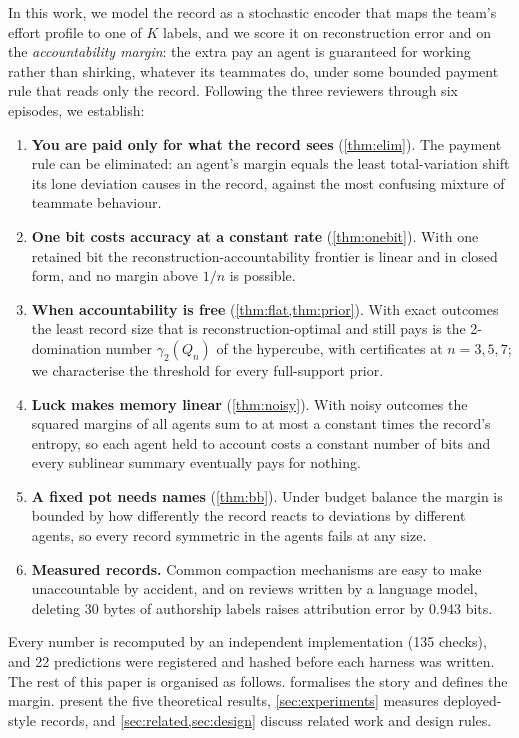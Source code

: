 \documentclass[sigconf,anonymous,acmthm=false]{acmart}
\theoremstyle{acmplain}
\theoremstyle{acmdefinition}
\begin{document}
In this work, we model the record as a stochastic encoder that maps the team's effort
profile to one of $K$ labels, and we score it on reconstruction error and on the
\emph{accountability margin}: the extra pay an agent is guaranteed for working rather than
shirking, whatever its teammates do, under some bounded payment rule that reads only the
record. Following the three reviewers through six episodes, we establish:
\begin{enumerate}
\item \textbf{You are paid only for what the record sees} (\cref{thm:elim}). The payment
rule can be eliminated: an agent's margin equals the least total-variation shift its lone
deviation causes in the record, against the most confusing mixture of teammate behaviour.
\item \textbf{One bit costs accuracy at a constant rate} (\cref{thm:onebit}). With one
retained bit the reconstruction-accountability frontier is linear and in closed form, and
no margin above $1/n$ is possible.
\item \textbf{When accountability is free} (\cref{thm:flat,thm:prior}). With exact outcomes
the least record size that is reconstruction-optimal and still pays is the 2-domination
number $\gamma_2(Q_n)$ of the hypercube, with certificates at $n=3,5,7$; we characterise
the threshold for every full-support prior.
\item \textbf{Luck makes memory linear} (\cref{thm:noisy}). With noisy outcomes the squared
margins of all agents sum to at most a constant times the record's entropy, so each agent
held to account costs a constant number of bits and every sublinear summary eventually
pays for nothing.
\item \textbf{A fixed pot needs names} (\cref{thm:bb}). Under budget balance the margin is
bounded by how differently the record reacts to deviations by different agents, so every
record symmetric in the agents fails at any size.
\item \textbf{Measured records.} Common compaction mechanisms are easy to make
unaccountable by accident, and on reviews written by a language model, deleting 30 bytes
of authorship labels raises attribution error by 0.943 bits.
\end{enumerate}
Every number is recomputed by an independent implementation (135 checks), and 22
predictions were registered and hashed before each harness was written. The rest of this
paper is organised as follows.  formalises the story and defines the
margin.  present the five theoretical
results, \cref{sec:experiments} measures deployed-style records, and
\cref{sec:related,sec:design} discuss related work and design rules.
\end{document}
